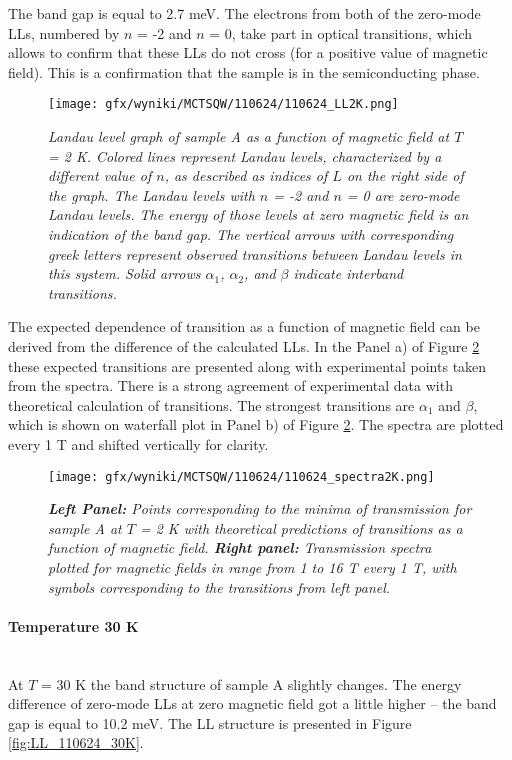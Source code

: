 \documentclass[titlepage,a4paper]{book}
\newcommand{\wciecie}{\quad\phantom{v}}
\newcommand{\myparagraph}[1]{\paragraph{#1}\mbox{}\\}
\begin{document}
The band gap is equal to 2.7 meV. The electrons from both of the zero-mode LLs, numbered by $n$ = -2 and $n$ = 0, take part in optical transitions, which allows to confirm that these LLs do not cross (for a positive value of magnetic field). This is a confirmation that the sample is in the semiconducting phase. 

\begin{figure}[ht]
	\centering
	\texttt{[image: gfx/wyniki/MCTSQW/110624/110624\_LL2K.png]}
	\vspace{-10pt}
	\caption{\textit{Landau level graph of sample A as a function of magnetic field at $T$ = 2 K. Colored lines represent Landau levels, characterized by a different value of $n$, as described as indices of $L$ on the right side of the graph. The Landau levels with $n$ = -2 and $n$ = 0 are zero-mode Landau levels. The energy of those levels at zero magnetic field is an indication of the band gap. The vertical arrows with corresponding greek letters represent observed transitions between Landau levels in this system. Solid arrows $\alpha_1$, $\alpha_2$, and $\beta$ indicate interband transitions.}}
	\label{fig:LL_110624_2K}
\end{figure}

The expected dependence of transition as a function of magnetic field can be derived from the difference of the calculated LLs. In the Panel a) of Figure \ref{fig:Spectra_110624_2K} these expected transitions are presented along with experimental points taken from the spectra. There is a strong agreement of experimental data with theoretical calculation of transitions. The strongest transitions are $\alpha_1$ and $\beta$, which is shown on waterfall plot in Panel b) of Figure \ref{fig:Spectra_110624_2K}. The spectra are plotted every 1 T and shifted vertically for clarity.

\begin{figure}[ht]
	\centering
	\texttt{[image: gfx/wyniki/MCTSQW/110624/110624\_spectra2K.png]}
	\vspace{-10pt}
	\caption{\textit{\textbf{Left Panel:} Points corresponding to the minima of transmission for sample A at $T$ = 2 K with theoretical predictions of transitions as a function of magnetic field. \textbf{Right panel:} Transmission spectra plotted for magnetic fields in range from 1 to 16 T every 1 T, with symbols corresponding to the transitions from left panel.}}
	\label{fig:Spectra_110624_2K}
\end{figure}

\clearpage
\myparagraph{Temperature 30 K}
\wciecie
At $T$ = 30 K the band structure of sample A slightly changes. The energy difference of zero-mode LLs at zero magnetic field got a little higher -- the band gap is equal to 10.2 meV. The LL structure is presented in Figure \ref{fig:LL_110624_30K}.
\end{document}

